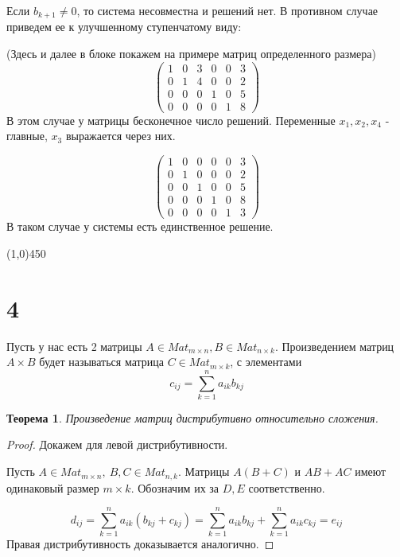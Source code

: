 \documentclass[a4paper,12pt]{article}
\newtheorem*{ther}{Теорема}
\begin{document}
	Если $b_{k+1} \neq 0$, то система несовместна и решений нет. В противном случае приведем ее к улучшенному ступенчатому виду:
	
	(Здесь и далее в блоке покажем на примере матриц определенного размера)
	\[
	\left(
	\begin{array}{ccccc|c}
	1 & 0 & 3 & 0 & 0 & 3 \\
	0 & 1 & 4 & 0 & 0 & 2 \\
	0 & 0 & 0 & 1 & 0 & 5 \\
	0 & 0 & 0 & 0 & 1 & 8
	\end{array}
	\right)
	\]
	В этом случае у матрицы бесконечное число решений. Переменные $x_1, x_2, x_4$ - главные, $x_3$ выражается через них.
	
	\[
	\left(
	\begin{array}{ccccc|c}
	1 & 0 & 0 & 0 & 0 & 3 \\
	0 & 1 & 0 & 0 & 0 & 2 \\
	0 & 0 & 1 & 0 & 0 & 5 \\
	0 & 0 & 0 & 1 & 0 & 8 \\
	0 & 0 & 0 & 0 & 1 & 3 
	\end{array}
	\right)
	\]
	В таком случае у системы есть единственное решение.
	
	
	\begin{center}
		\line(1,0){450}
	\end{center}


		\section*{4}
	Пусть у нас есть 2 матрицы $A \in Mat_{m \times n}, B \in Mat_{n \times k}$. Произведением матриц $A \times B$ будет называться матрица $C \in Mat_{m \times k }$, с элементами \[c_{ij} = \sum_{k = 1}^{n}a_{ik}b_{kj}\]
	\begin{ther}
		Произведение матриц дистрибутивно относительно сложения.
	\end{ther}
	
	\begin{proof}
		Докажем для левой дистрибутивности.
		
		Пусть $A \in Mat_{m \times n}, \ B, C \in Mat_{n, k}$. Матрицы $A(B + C)$ и $AB + AC$ имеют одинаковый размер $m \times k$. Обозначим их за $D, E$ соответственно.
		
		\[
		d_{ij} = \sum_{k =1}^{n} a_{ik}(b_{kj} + c_{kj}) = \sum_{k = 1}^{n} a_{ik}b_{kj} + \sum_{k = 1}^{n} a_{ik}c_{kj} = e_{ij}
		\]
		Правая дистрибутивность доказывается аналогично.
	\end{proof}
\end{document}
